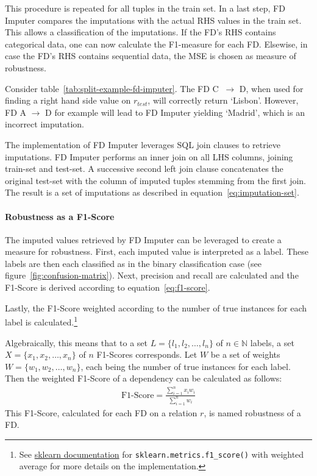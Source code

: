 This procedure is repeated for all tuples in the train set.
In a last step, FD Imputer compares the imputations with the actual RHS values in the train set.
This allows a classification of the imputations.
If the FD's RHS contains categorical data, one can now calculate the F1-measure for each FD.
Elsewise, in case the FD's RHS contains sequential data, the MSE is chosen as measure of robustness.

Consider table~\ref{tab:split-example-fd-imputer}.
The FD \textsc{C} \( \ \to \) \textsc{D}, when used for finding a right hand side value on \( r_{test} \), will correctly return `Lisbon'.
However, FD \textsc{A} \( \to \) \textsc{D} for example will lead to FD Imputer yielding `Madrid', which is an incorrect imputation.

The implementation of FD Imputer leverages SQL join clauses to retrieve imputations.
FD Imputer performs an inner join on all LHS columns, joining train-set and test-set.
A successive second left join clause concatenates the original test-set with the column of imputed tuples stemming from the first join.
The result is a set of imputations as described in equation~\ref{eq:imputation-set}.

\paragraph{Robustness as a F1-Score} The imputed values retrieved by FD Imputer can be leveraged to create a measure for robustness.
First, each imputed value is interpreted as a label.
These labels are then each classified as in the binary classification case (see figure~\ref{fig:confusion-matrix}).
Next, precision and recall are calculated and the F1-Score is derived according to equation~\ref{eq:f1-score}.

Lastly, the F1-Score weighted according to the number of true instances for each label is calculated.\footnote{See \href{https://scikit-learn.org/stable/modules/generated/sklearn.metrics.f1_score.html}{sklearn documentation} for \texttt{sklearn.metrics.f1\_score()} with weighted average for more details on the implementation.}

Algebraically, this means that to a set \( L = \{ l_1, l_2, \dots, l_n \} \) of \( n \in \mathbb{N} \) labels, a set \( X = \{ x_1, x_2, \dots, x_n \}\) of \( n \) F1-Scores corresponds.
Let \( W \) be a set of weights \( W = \{ w_1, w_2, \dots, w_n \} \), each being the number of true instances for each label.
Then the weighted F1-Score of a dependency can be calculated as follows:
\begin{align}\label{eq:fd-imputer-f1-score}
    \text{F1-Score} = \frac{\sum_{i=1}^{n} x_i w_i}{\sum_{i=1}^{n}w_i}
\end{align}
This F1-Score, calculated for each FD on a relation \( r \), is named robustness of a FD.

